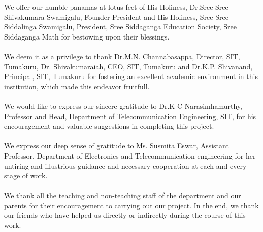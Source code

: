 \acknowledgements

We offer our humble panamas at lotus feet of His Holiness, Dr.Sree Sree Shivakumara
Swamigalu, Founder President and His Holiness, Sree Sree Siddalinga Swamigalu,
President, Sree Siddaganga Education Society, Sree Siddaganga Math for bestowing
upon their blessings.\\\\We deem it as a privilege to thank Dr.M.N. Channabasappa, Director, SIT, Tumakuru, Dr.
Shivakumaraiah, CEO, SIT, Tumakuru and Dr.K.P. Shivanand, Principal, SIT, Tumakuru
for fostering an excellent academic environment in this institution, which made this endeavor
fruitfull.\\\\We would like to express our sincere gratitude to Dr.K C Narasimhamurthy, Professor
and Head, Department of Telecommunication Engineering, SIT, for his encouragement
and valuable suggestions in completing this project.\\\\We express our deep sense of gratitude to  Ms. Susmita Eswar, Assistant Professor, Department
of Electronics and Telecommunication engineering for her untiring and illustrious guidance
and necessary cooperation at each and every stage of work.\\\\We thank all the teaching and non-teaching staff of the department and our parents
for their encouragement to carrying out our project. In the end, we thank our friends
who have helped us directly or indirectly during the course of this work.
